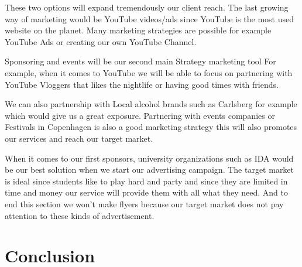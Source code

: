 \documentclass[12p]{article}
\begin{document}
These two options will expand tremendously our client reach.
The last growing way of marketing would be YouTube videos/ads since YouTube is the most used website on the planet.
Many marketing strategies are possible for example YouTube Ads or creating our own YouTube Channel.

Sponsoring and events will be our second main Strategy marketing tool
For example, when it comes to YouTube we will be able to focus on partnering with YouTube Vloggers that likes the nightlife or having good times with friends.

We can also partnership with Local alcohol brands such as Carlsberg for example which would give us a great exposure.
Partnering with events companies or Festivals in Copenhagen is also a good marketing strategy this will also promotes our services and reach our target market.

When it comes to our first sponsors, university organizations such as IDA would be our best solution when we start our advertising campaign.
The target market is ideal since students like to play hard and party and since they are limited in time and money our service will provide them with all what they need. And to end this section we won’t make flyers because our target market does not pay attention to these kinds of advertisement.

\newpage


\newpage
\section{Conclusion}


\newpage
\printbibliography[heading=bibintoc,title={References}]

\end{document}
